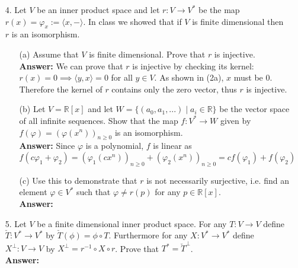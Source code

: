 \documentclass{article}
\begin{document}
\begin{itemize}
\begin{itemize}
	\end{itemize}
	\item [4.] Let $V$ be an inner product space and let $r:V\rightarrow V^*$ be the map $r(x)=\varphi_x:=\langle x,-\rangle$. In class we showed that if $V$ is finite dimensional then $r$ is an isomorphism.
	\begin{itemize}
		\item [(a)] Assume that $V$ is finite dimensional. Prove that $r$ is injective.\\
		\textbf{Answer: } We can prove that $r$ is injective by checking its kernel: $r(x)=0\implies\langle y,x\rangle=0$ for all $y\in V$. As shown in (2a), $x$ must be $0$. Therefore the kernel of $r$ contains only the zero vector, thus $r$ is injective.
		\item [(b)] Let $V=\mathbb{R}[x]$ and let $W=\{(a_0,a_1,...)\mid a_i\in\mathbb{R}\}$ be the vector space of all infinite sequences. Show that the map $\mathit{f}:V^*\rightarrow W$ given by $\mathit{f}(\varphi)=(\varphi(x^n))_{n\geq 0}$ is an isomorphism.\\
		\textbf{Answer: } Since $\varphi$ is a polynomial, $\mathit{f}$ is linear as $\mathit{f}(c\varphi_1+\varphi_2)=(\varphi_1(cx^n))_{n\geq 0}+(\varphi_2(x^n))_{n\geq 0}=c\mathit{f}(\varphi_1)+\mathit{f}(\varphi_2)$
		\item [(c)] Use this to demonstrate that $r$ is not necessarily surjective, i.e. find an element $\varphi\in V^*$ such that $\varphi\neq r(p)$ for any $p\in\mathbb{R}[x]$.\\
		\textbf{Answer: } 
	\end{itemize}
	\item [5.] Let $V$ be a finite dimensional inner product space. For any $T:V\rightarrow V$ define $\check{T}:V^*\rightarrow V^*$ by $\check{T}(\phi)=\phi\circ T$. Furthermore for any $X:V^*\rightarrow V^*$ define $X^\perp:V\rightarrow V$ by $X^\perp=r^{-1}\circ X\circ r$. Prove that $T^*=\check{T}^\perp$.\\
	\textbf{Answer: }
\end{itemize}
\end{document}
